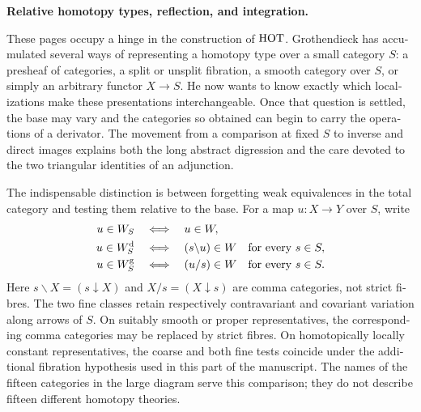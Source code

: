 \begin{otherlanguage}{english}
\begingroup
{}
\noindent\textbf{Relative homotopy types, reflection, and integration.}

These pages occupy a hinge in the construction of $\mathrm{HOT}$. Grothendieck has accumulated several ways of representing a homotopy type over a small category $S$: a presheaf of categories, a split or unsplit fibration, a smooth category over $S$, or simply an arbitrary functor $X\to S$. He now wants to know exactly which localizations make these presentations interchangeable. Once that question is settled, the base may vary and the categories so obtained can begin to carry the operations of a derivator. The movement from a comparison at fixed $S$ to inverse and direct images explains both the long abstract digression and the care devoted to the two triangular identities of an adjunction.

The indispensable distinction is between forgetting weak equivalences in the total category and testing them relative to the base. For a map $u:X\to Y$ over $S$, write
\[
\begin{aligned}
u\in W_S&\quad\Longleftrightarrow\quad u\in W,\\
u\in W_S^{\mathrm d}&\quad\Longleftrightarrow\quad
 (s\backslash u)\in W\quad\hbox{for every }s\in S,\\
u\in W_S^{\mathrm g}&\quad\Longleftrightarrow\quad
 (u/s)\in W\quad\hbox{for every }s\in S.
\end{aligned}
\]
Here $s\backslash X=(s\downarrow X)$ and $X/s=(X\downarrow s)$ are comma categories, not strict fibres. The two fine classes retain respectively contravariant and covariant variation along arrows of $S$. On suitably smooth or proper representatives, the corresponding comma categories may be replaced by strict fibres. On homotopically locally constant representatives, the coarse and both fine tests coincide under the additional fibration hypothesis used in this part of the manuscript. The names of the fifteen categories in the large diagram serve this comparison; they do not describe fifteen different homotopy theories.


\end{otherlanguage}
